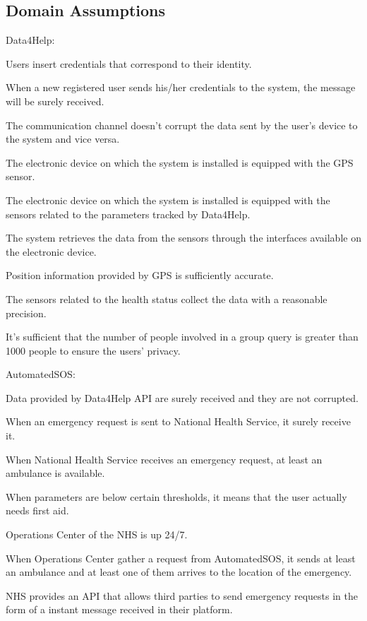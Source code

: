\subsection{Domain Assumptions}
Data4Help:  
\begin{enumerate} [label={[D\arabic*]}]
    \item Users insert credentials that correspond to their identity.
    \item When a new registered user sends his/her credentials to the system, the message will be surely received.
    \item The communication channel doesn't corrupt the data sent by the user's device to the system and vice versa.
    \item The electronic device on which the system is installed is equipped with the GPS sensor.
    \item The electronic device on which the system is installed is equipped with the sensors related to the parameters tracked by Data4Help.
    \item The system retrieves the data from the sensors through the interfaces available on the electronic device.
    \item Position information provided by GPS is sufficiently accurate\cite{gps}.
    \item The sensors related to the health status collect the data with a reasonable precision.
    \item It's sufficient that the number of people involved in a group query is greater than 1000 people to ensure the users' privacy.
\end{enumerate}  
\noindent
AutomatedSOS:
\begin{enumerate} [resume, label={[D\arabic*]}]
    \item Data provided by Data4Help API are surely received and they are not corrupted.
    \item When an emergency request is sent to National Health Service, it surely receive it.
    \item When National Health Service receives an emergency request, at least an ambulance is available.
    \item When parameters are below certain thresholds, it means that the user actually needs first aid.
    \item Operations Center of the NHS is up 24/7.
    \item When Operations Center gather a request from AutomatedSOS, it sends at least an ambulance and at least one of them arrives to the location of the emergency.
    \item NHS provides an API that allows third parties to send emergency requests in the form of a instant message received in their platform.
\end{enumerate}